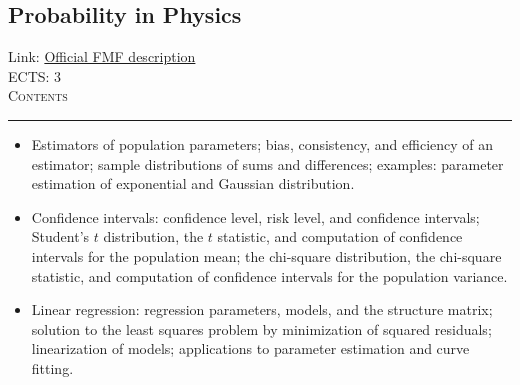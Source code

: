 \documentclass[11pt, a4paper]{article}
\newenvironment{course}[3]{
\subsection{#1}%
Link: \href{#2}{Official FMF description}\\%
ECTS: #3%
\vspace{1ex}
\\
{\large \textsc{Contents}}\\[-0.9ex]%
\rule{\textwidth}{0.5pt}
\vspace{-3ex}
}
{}
\newenvironment{chapter}[1]{
\begin{tcolorbox}[title=#1, breakable]
}
{\end{tcolorbox}}
\begin{document}
\begin{course}{Probability in Physics}{https://www.fmf.uni-lj.si/en/study-physics/programmes/1fiz/2020/7000777/courses/1177/}{3}
\begin{chapter}{Introduction to statistics}
\begin{itemize}
            \item Estimators of population parameters; bias, consistency, and efficiency of an estimator;
            sample distributions of sums and differences; examples: parameter estimation of exponential and Gaussian distribution.

            \item Confidence intervals: confidence level, risk level, and confidence intervals; Student's $ t $ distribution, the $ t $ statistic, and computation of confidence intervals for the population mean; the chi-square distribution, the chi-square statistic, and computation of confidence intervals for the population variance.

            \item Linear regression: regression parameters, models, and the structure matrix; solution to the least squares problem by minimization of squared residuals; linearization of models; applications to parameter estimation and curve fitting.
        
        \end{itemize}
    \end{chapter}
\end{course}
\end{document}

